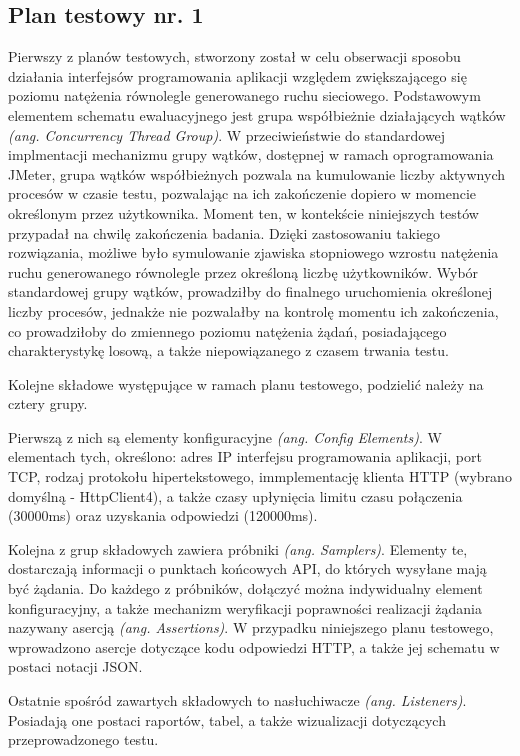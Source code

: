 \subsection*{Plan testowy nr. 1}
\label{plan-testowy-1}
Pierwszy z planów testowych, stworzony został w celu obserwacji sposobu działania interfejsów programowania aplikacji względem zwiększającego się poziomu natężenia równolegle generowanego ruchu sieciowego. Podstawowym elementem schematu ewaluacyjnego jest grupa współbieżnie działających wątków \textit{(ang. Concurrency Thread Group)}. W przeciwieństwie do standardowej implmentacji mechanizmu grupy wątków, dostępnej w ramach oprogramowania JMeter, grupa wątków współbieżnych pozwala na kumulowanie liczby aktywnych procesów w czasie testu, pozwalając na ich zakończenie dopiero w momencie określonym przez użytkownika. Moment ten, w kontekście niniejszych testów przypadał na chwilę zakończenia badania. Dzięki zastosowaniu takiego rozwiązania, możliwe było symulowanie zjawiska stopniowego wzrostu natężenia ruchu generowanego równolegle przez określoną liczbę użytkowników. Wybór standardowej grupy wątków, prowadziłby do finalnego uruchomienia określonej liczby procesów, jednakże nie pozwalałby na kontrolę momentu ich zakończenia, co prowadziłoby do zmiennego poziomu natężenia żądań, posiadającego charakterystykę losową, a także niepowiązanego z czasem trwania testu.

Kolejne składowe występujące w ramach planu testowego, podzielić należy na cztery grupy. 

Pierwszą z nich są elementy konfiguracyjne \textit{(ang. Config Elements)}. W elementach tych, określono: adres IP interfejsu programowania aplikacji, port TCP, rodzaj protokołu hipertekstowego, immplementację klienta HTTP (wybrano domyślną - HttpClient4), a także czasy upłynięcia limitu czasu połączenia (30000ms) oraz uzyskania odpowiedzi (120000ms).

Kolejna z grup składowych zawiera próbniki \textit{(ang. Samplers)}. Elementy te, dostarczają informacji o punktach końcowych API, do których wysyłane mają być żądania. Do każdego z próbników, dołączyć można indywidualny element konfiguracyjny, a także mechanizm weryfikacji poprawności realizacji żądania nazywany asercją \textit{(ang. Assertions)}. W przypadku niniejszego planu testowego, wprowadzono asercje dotyczące kodu odpowiedzi HTTP, a także jej schematu w postaci notacji JSON.

Ostatnie spośród zawartych składowych to nasłuchiwacze \textit{(ang. Listeners)}. Posiadają one postaci raportów, tabel, a także wizualizacji dotyczących przeprowadzonego testu.

